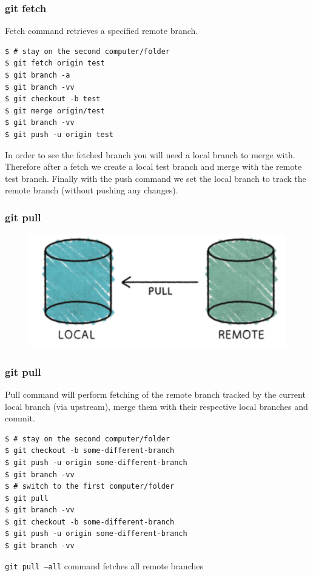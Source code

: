 \documentclass{beamer}
\begin{document}
\begin{frame}[fragile]
\frametitle{git fetch}

Fetch command retrieves a specified remote branch.

\begin{lstlisting}
$ # stay on the second computer/folder
$ git fetch origin test
$ git branch -a
$ git branch -vv
$ git checkout -b test
$ git merge origin/test
$ git branch -vv
$ git push -u origin test
\end{lstlisting}

In order to see the fetched branch you will need a local branch to
merge with. Therefore after a fetch we create a local test branch and
merge with the remote test branch. Finally with the push command we
set the local branch to track the remote branch (without pushing any
changes).


\end{frame}


\begin{frame}[fragile]
\frametitle{git pull}
\begin{figure}

  \includegraphics[scale=0.3]{figures/f7.png}
\end{figure}
\end{frame}

\begin{frame}[fragile]
\frametitle{git pull}

Pull command will perform fetching of the remote branch tracked by the
current local branch (via upstream), merge them with their
respective local branches and commit.


\begin{lstlisting}
$ # stay on the second computer/folder
$ git checkout -b some-different-branch
$ git push -u origin some-different-branch
$ git branch -vv
$ # switch to the first computer/folder
$ git pull
$ git branch -vv
$ git checkout -b some-different-branch
$ git push -u origin some-different-branch
$ git branch -vv
\end{lstlisting}

\texttt{git pull ---all} command fetches all remote branches

\end{frame}
\end{document}
